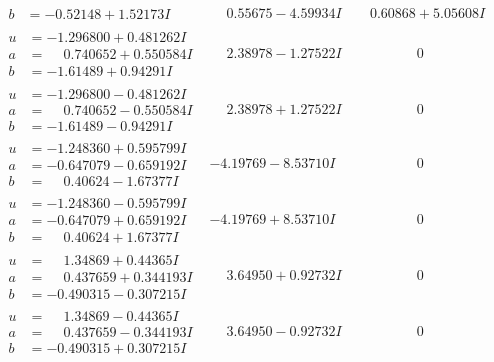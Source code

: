 \documentclass[1p]{elsarticle_modified}
\theoremstyle{definition}
\begin{document}
$$\begin{array}{c|c|c}
\begin{aligned}
b &= -0.52148 + 1.52173 I\end{aligned}
 & \phantom{-}0.55675 - 4.59934 I & \phantom{-}0.60868 + 5.05608 I \\ \hline\begin{aligned}
u &= -1.296800 + 0.481262 I \\
a &= \phantom{-}0.740652 + 0.550584 I \\
b &= -1.61489 + 0.94291 I\end{aligned}
 & \phantom{-}2.38978 - 1.27522 I & \phantom{-0.000000 } 0 \\ \hline\begin{aligned}
u &= -1.296800 - 0.481262 I \\
a &= \phantom{-}0.740652 - 0.550584 I \\
b &= -1.61489 - 0.94291 I\end{aligned}
 & \phantom{-}2.38978 + 1.27522 I & \phantom{-0.000000 } 0 \\ \hline\begin{aligned}
u &= -1.248360 + 0.595799 I \\
a &= -0.647079 - 0.659192 I \\
b &= \phantom{-}0.40624 - 1.67377 I\end{aligned}
 & -4.19769 - 8.53710 I & \phantom{-0.000000 } 0 \\ \hline\begin{aligned}
u &= -1.248360 - 0.595799 I \\
a &= -0.647079 + 0.659192 I \\
b &= \phantom{-}0.40624 + 1.67377 I\end{aligned}
 & -4.19769 + 8.53710 I & \phantom{-0.000000 } 0 \\ \hline\begin{aligned}
u &= \phantom{-}1.34869 + 0.44365 I \\
a &= \phantom{-}0.437659 + 0.344193 I \\
b &= -0.490315 - 0.307215 I\end{aligned}
 & \phantom{-}3.64950 + 0.92732 I & \phantom{-0.000000 } 0 \\ \hline\begin{aligned}
u &= \phantom{-}1.34869 - 0.44365 I \\
a &= \phantom{-}0.437659 - 0.344193 I \\
b &= -0.490315 + 0.307215 I\end{aligned}
 & \phantom{-}3.64950 - 0.92732 I & \phantom{-0.000000 } 0 \\ \hline\begin{aligned}

\end{aligned}
\end{array}$$
\end{document}
